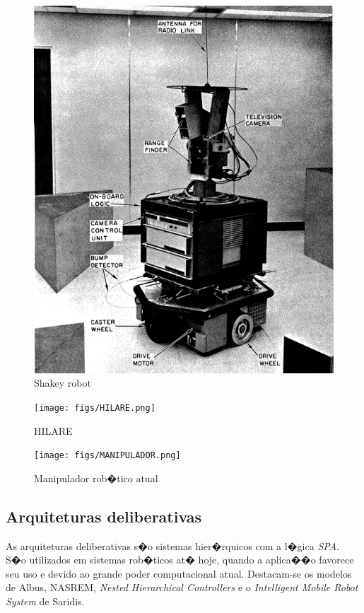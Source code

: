 \begin{figure}[H]
\centering
\includegraphics[width=1\columnwidth]{figs/SHAKEY_1.png}
\caption{Shakey robot}
\label{SHAKEY_1}
\end{figure}

\begin{figure}[H]
\centering
\texttt{[image: figs/HILARE.png]}
\caption{HILARE}
\label{hilare}
\end{figure}

\begin{figure}[H]
\centering
\texttt{[image: figs/MANIPULADOR.png]}
\caption{Manipulador rob�tico atual}
\label{manipulador}
\end{figure}

\subsection{Arquiteturas deliberativas}
As arquiteturas deliberativas s�o sistemas hier�rquicos com a l�gica
\textit{SPA}. S�o utilizados em sistemas rob�ticos at� hoje, quando a aplica��o
favorece seu uso e devido ao grande poder computacional atual. Destacam-se os modelos de Albus,
NASREM, \textit{Nested Hierarchical Controllers} e o \emph{Intelligent Mobile
Robot System} de Saridis.

